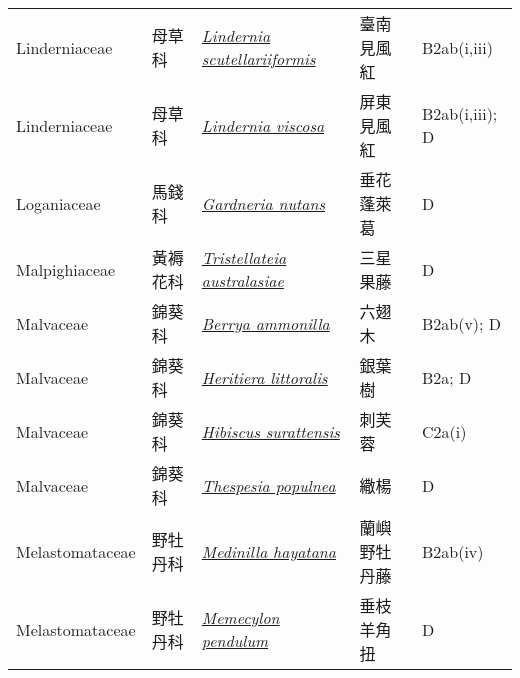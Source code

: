 {\begin{longtable}{p{2.5cm}p{2.5cm}p{4.5cm}p{2.5cm}p{3cm}}
    Linderniaceae & 母草科 & \href{http://www.theplantlist.org/tpl1.1/search?q=Lindernia+scutellariiformis}{\textit{Lindernia scutellariiformis} } & 臺南見風紅 & B2ab(i,iii) \index{Lindernia@\textit{Lindernia}!scutellariiformis@\textit{scutellariiformis}}  \index{臺南見風紅} \\
    Linderniaceae & 母草科 & \href{http://www.theplantlist.org/tpl1.1/search?q=Lindernia+viscosa}{\textit{Lindernia viscosa} } & 屏東見風紅 & B2ab(i,iii); D \index{Lindernia@\textit{Lindernia}!viscosa@\textit{viscosa}}  \index{屏東見風紅} \\
    Loganiaceae & 馬錢科 & \href{http://www.theplantlist.org/tpl1.1/search?q=Gardneria+nutans}{\textit{Gardneria nutans} } & 垂花蓬萊葛 & D \index{Gardneria@\textit{Gardneria}!nutans@\textit{nutans}}  \index{垂花蓬萊葛} \\
    Malpighiaceae & 黃褥花科 & \href{http://www.theplantlist.org/tpl1.1/search?q=Tristellateia+australasiae}{\textit{Tristellateia australasiae} } & 三星果藤 & D \index{Tristellateia@\textit{Tristellateia}!australasiae@\textit{australasiae}}  \index{三星果藤} \\
    Malvaceae & 錦葵科 & \href{http://www.theplantlist.org/tpl1.1/search?q=Berrya+ammonilla}{\textit{Berrya ammonilla} } & 六翅木 & B2ab(v); D \index{Berrya@\textit{Berrya}!ammonilla@\textit{ammonilla}}  \index{六翅木} \\
    Malvaceae & 錦葵科 & \href{http://www.theplantlist.org/tpl1.1/search?q=Heritiera+littoralis}{\textit{Heritiera littoralis} } & 銀葉樹 & B2a; D \index{Heritiera@\textit{Heritiera}!littoralis@\textit{littoralis}}  \index{銀葉樹} \\
    Malvaceae & 錦葵科 & \href{http://www.theplantlist.org/tpl1.1/search?q=Hibiscus+surattensis}{\textit{Hibiscus surattensis} } & 刺芙蓉 & C2a(i) \index{Hibiscus@\textit{Hibiscus}!surattensis@\textit{surattensis}}  \index{刺芙蓉} \\
    Malvaceae & 錦葵科 & \href{http://www.theplantlist.org/tpl1.1/search?q=Thespesia+populnea}{\textit{Thespesia populnea} } & 繖楊 & D \index{Thespesia@\textit{Thespesia}!populnea@\textit{populnea}}  \index{繖楊} \\
    Melastomataceae & 野牡丹科 & \href{http://www.theplantlist.org/tpl1.1/search?q=Medinilla+hayatana}{\textit{Medinilla hayatana} } & 蘭嶼野牡丹藤 & B2ab(iv) \index{Medinilla@\textit{Medinilla}!hayatana@\textit{hayatana}}  \index{蘭嶼野牡丹藤} \\
    Melastomataceae & 野牡丹科 & \href{http://www.theplantlist.org/tpl1.1/search?q=Memecylon+pendulum}{\textit{Memecylon pendulum} } & 垂枝羊角扭 & D \index{Memecylon@\textit{Memecylon}!pendulum@\textit{pendulum}}  \index{垂枝羊角扭} \\

\end{longtable}}
